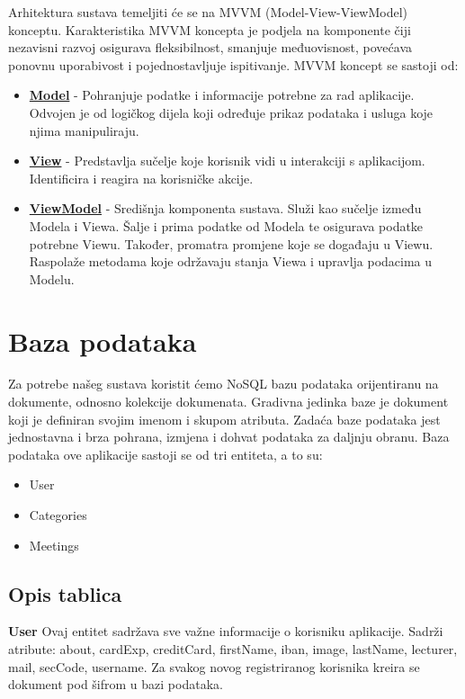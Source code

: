 		Arhitektura sustava temeljiti će se na MVVM (Model-View-ViewModel) konceptu. Karakteristika MVVM koncepta je podjela na komponente čiji nezavisni razvoj osigurava fleksibilnost, smanjuje međuovisnost, povećava ponovnu uporabivost i pojednostavljuje ispitivanje. \newline
		MVVM koncept se sastoji od:
	\begin{itemize}
		\item \textbf{\underline{Model}} - Pohranjuje podatke i informacije potrebne za rad aplikacije. Odvojen je od logičkog dijela koji određuje prikaz podataka i usluga koje njima manipuliraju.
		\item \textbf{\underline{View}} - Predstavlja sučelje koje korisnik vidi u interakciji s aplikacijom. Identificira i reagira na korisničke akcije.
		\item \textbf{\underline{ViewModel}} - Središnja komponenta sustava. Služi kao sučelje između Modela i Viewa. Šalje i prima podatke od Modela te osigurava podatke potrebne Viewu. Također, promatra promjene koje se događaju u Viewu. Raspolaže metodama koje održavaju stanja Viewa i upravlja podacima u Modelu.
	\end{itemize}
		
	\eject

				
		\section{Baza podataka}
			
			\text Za potrebe našeg sustava koristit ćemo NoSQL bazu podataka orijentiranu na dokumente, odnosno kolekcije dokumenata. Gradivna jedinka baze je dokument koji je definiran svojim imenom i skupom atributa. Zadaća baze podataka jest jednostavna i brza pohrana, izmjena i dohvat podataka za daljnju obranu. Baza podataka ove aplikacije sastoji se od tri entiteta, a to su:
			
			\begin{itemize}
				\item User
				\item Categories
				\item Meetings
			\end{itemize}
		
			\subsection{Opis tablica}
			

				\textbf{User} \text    Ovaj entitet sadržava sve važne informacije o korisniku aplikacije. Sadrži atribute: about, cardExp, creditCard, firstName, iban, image, lastName, lecturer, mail, secCode, username. Za svakog novog registriranog korisnika kreira se dokument pod šifrom u bazi podataka.
				
